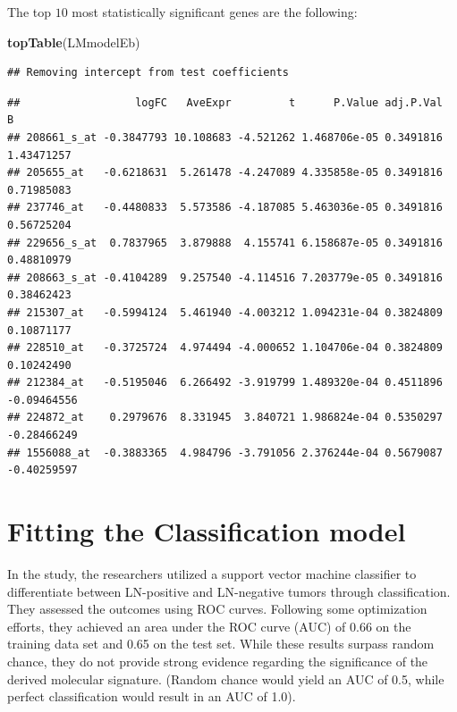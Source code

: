\documentclass[
]{article}
\newenvironment{Shaded}{\begin{snugshade}}{\end{snugshade}}
\newcommand{\FunctionTok}[1]{\textcolor[rgb]{0.13,0.29,0.53}{\textbf{#1}}}
\newcommand{\NormalTok}[1]{#1}
\begin{document}
The top \(10\) most statistically significant genes are the following:

\begin{Shaded}
\begin{Highlighting}[]
\FunctionTok{topTable}\NormalTok{(LMmodelEb)}
\end{Highlighting}
\end{Shaded}

\begin{verbatim}
## Removing intercept from test coefficients
\end{verbatim}

\begin{verbatim}
##                  logFC   AveExpr         t      P.Value adj.P.Val           B
## 208661_s_at -0.3847793 10.108683 -4.521262 1.468706e-05 0.3491816  1.43471257
## 205655_at   -0.6218631  5.261478 -4.247089 4.335858e-05 0.3491816  0.71985083
## 237746_at   -0.4480833  5.573586 -4.187085 5.463036e-05 0.3491816  0.56725204
## 229656_s_at  0.7837965  3.879888  4.155741 6.158687e-05 0.3491816  0.48810979
## 208663_s_at -0.4104289  9.257540 -4.114516 7.203779e-05 0.3491816  0.38462423
## 215307_at   -0.5994124  5.461940 -4.003212 1.094231e-04 0.3824809  0.10871177
## 228510_at   -0.3725724  4.974494 -4.000652 1.104706e-04 0.3824809  0.10242490
## 212384_at   -0.5195046  6.266492 -3.919799 1.489320e-04 0.4511896 -0.09464556
## 224872_at    0.2979676  8.331945  3.840721 1.986824e-04 0.5350297 -0.28466249
## 1556088_at  -0.3883365  4.984796 -3.791056 2.376244e-04 0.5679087 -0.40259597
\end{verbatim}

\hypertarget{fitting-the-classification-model}{%
\section{Fitting the Classification
model}\label{fitting-the-classification-model}}

In the study, the researchers utilized a support vector machine
classifier to differentiate between LN-positive and LN-negative tumors
through classification. They assessed the outcomes using ROC curves.
Following some optimization efforts, they achieved an area under the ROC
curve (AUC) of 0.66 on the training data set and 0.65 on the test set.
While these results surpass random chance, they do not provide strong
evidence regarding the significance of the derived molecular signature.
(Random chance would yield an AUC of 0.5, while perfect classification
would result in an AUC of 1.0).
\end{document}
